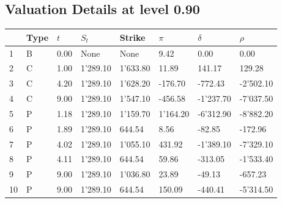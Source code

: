 \documentclass[12pt]{article}
\begin{document}
\begin{center} 
 \subsection{Valuation Details at level 0.90} 
 \par 
 \begin{scriptsize} 
 \begin{tabular}{p{13.1 mm}|p{13.1 mm}|p{13.1 mm}|p{13.1 mm}|p{13.1 mm}|p{13.1 mm}|p{13.1 mm}|p{13.1 mm}} 
          &     Type &      $t$ &    $S_t$ &   Strike &    $\pi$ & $\delta$ &   $\rho$ \\ \hline 
1 & B& 0.00& None& None& 9.42& 0.00& 0.00\\ 
2 & C& 1.00& 1'289.10& 1'633.80& 11.89& 141.17& 129.28\\ 
3 & C& 4.20& 1'289.10& 1'628.20& -176.70& -772.43& -2'502.10\\ 
4 & C& 9.00& 1'289.10& 1'547.10& -456.58& -1'237.70& -7'037.50\\ 
5 & P& 1.18& 1'289.10& 1'159.70& 1'164.20& -6'312.90& -8'882.20\\ 
6 & P& 1.89& 1'289.10& 644.54& 8.56& -82.85& -172.96\\ 
7 & P& 4.02& 1'289.10& 1'055.10& 431.92& -1'389.10& -7'329.10\\ 
8 & P& 4.11& 1'289.10& 644.54& 59.86& -313.05& -1'533.40\\ 
9 & P& 9.00& 1'289.10& 1'036.80& 23.89& -49.13& -657.23\\ 
10 & P& 9.00& 1'289.10& 644.54& 150.09& -440.41& -5'314.50\\ 
\end{tabular} 
  \end{scriptsize} 
 \end{center}%
\end{document}
